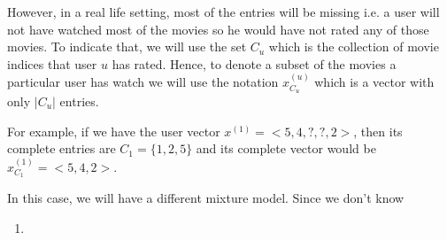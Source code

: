 \begin{enumerate}
However, in a real life setting, most of the entries will be missing i.e. a user will not have watched most of the movies so he would have not rated any of those movies. To indicate that, we will use the set $C_{u}$ which is the collection of movie indices that user $u$ has rated. Hence, to denote a subset of the movies a particular user has watch we will use the notation $x^{(u)}_{C_u}$ which is a vector with only $|C_u|$ entries.

For example, if we have the user vector $x^{(1)} = < 5, 4, ?, ?, 2>$, then its complete entries are $C_{1} = \{ 1, 2, 5\}$ and its complete vector would be $x^{(1)}_{C_1} = < 5, 4, 2>$.

In this case, we will have a different mixture model. Since we don't know 


\begin{enumerate}

\item 

\end{enumerate} 


\end{enumerate}





